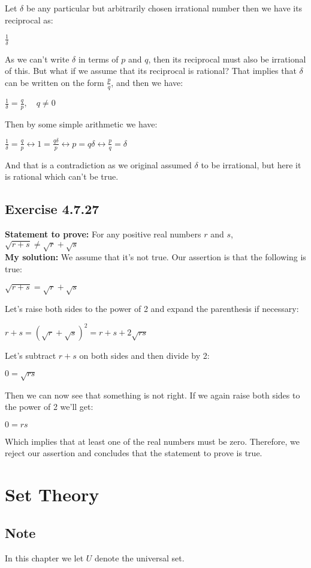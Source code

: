 \documentclass{report}
\newcommand{\cent}[1]{\begin{center}#1\end{center}}
\newcommand{\Prove}{\textbf{Statement to prove: }}
\newcommand{\solution}{\textbf{My solution: }}
\newcommand{\QED}{\boxed{}}
\newcommand{\Section}[1]{\section{#1}}
\newcommand{\Exercise}[1]{\subsection{Exercise #1}}
\begin{document}
	Let $\delta$ be any particular but arbitrarily chosen irrational number then we have its reciprocal as:
	
	\cent{$\frac{1}{\delta}$}
	
	As we can't write $\delta$ in terms of $p$ and $q$, then its reciprocal must also be irrational of this. But what if we assume that its reciprocal is rational? That implies that $\delta$ can be written on the form $\frac{p}{q}$, and then we have:
	
	\cent{$\frac{1}{\delta} = \frac{q}{p}, \quad q \neq 0$}
	
	Then by some simple arithmetic we have:
	
	\cent{$\frac{1}{\delta} = \frac{q}{p} \leftrightarrow 1=\frac{q\delta}{p} \leftrightarrow p = q \delta  \leftrightarrow \frac{p}{q} = \delta$}
	
	And that is a contradiction as we original assumed $\delta$ to be irrational, but here it is rational which can't be true.\\
	\QED
	
	\Exercise{4.7.27}
	
	\Prove
	For any positive real numbers $r$ and $s$, $\sqrt{r+s} \neq \sqrt{r} + \sqrt{s}$\\
	
	\solution
	We assume that it's not true. Our assertion is that the following is true:
	
	\cent{$\sqrt{r+s} = \sqrt{r} + \sqrt{s}$}
	
	Let's raise both sides to the power of 2 and expand the parenthesis if necessary:
	
	\cent{$r + s = (\sqrt{r} + \sqrt{s})^{2} = r + s + 2 \sqrt{rs}$}
	
	Let's subtract $r+s$ on both sides and then divide by 2:
	
	\cent{$0 = \sqrt{rs}$}
	
	Then we can now see that something is not right. If we again raise both sides to the power of 2 we'll get:
	
	\cent{$0 = rs$}
	
	Which implies that at least one of the real numbers must be zero. Therefore, we reject our assertion and concludes that the statement to prove is true.\\
	\QED
	\Section{Set Theory}
	\subsection*{Note}
	In this chapter we let $U$ denote the universal set.
	
\end{document}
